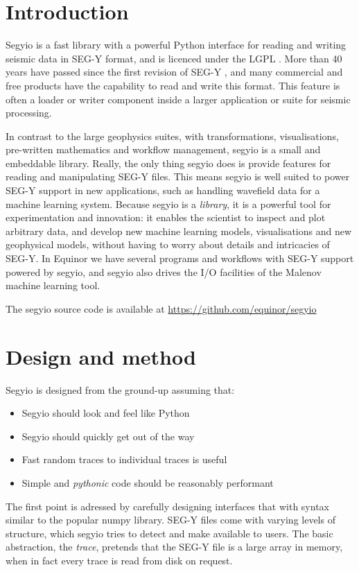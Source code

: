 \documentclass{article}
\begin{document}
\section{Introduction}

Segyio is a fast library with a powerful Python interface for reading and
writing seismic data in SEG-Y format, and is licenced under the LGPL
\citep{lgplv3}. More than 40 years have passed since the first revision of
SEG-Y \citep{barry}, and many commercial and free products have the capability
to read and write this format. This feature is often a loader or writer
component inside a larger application or suite for seismic processing.

In contrast to the large geophysics suites, with transformations,
visualisations, pre-written mathematics and workflow management, segyio is a
small and embeddable library. Really, the only thing segyio does is provide
features for reading and manipulating SEG-Y files. This means segyio is well
suited to power SEG-Y support in new applications, such as handling wavefield
data for a machine learning system. Because segyio is a \emph{library}, it is a
powerful tool for experimentation and innovation: it enables the scientist to
inspect and plot arbitrary data, and develop new machine learning models,
visualisations and new geophysical models, without having to worry about
details and intricacies of SEG-Y. In Equinor we have several programs and
workflows with SEG-Y support powered by segyio, and segyio also drives the I/O
facilities of the Malenov \citep{malenov} machine learning tool.

The segyio source code is available at \url{https://github.com/equinor/segyio}

\section{Design and method}

Segyio is designed from the ground-up assuming that:
\begin{itemize}
    \item Segyio should look and feel like Python
    \item Segyio should quickly get out of the way
    \item Fast random traces to individual traces is useful
    \item Simple and \emph{pythonic} code should be reasonably performant
\end{itemize}

The first point is adressed by carefully designing interfaces that with syntax
similar to the popular numpy \citep{numpy} library. SEG-Y files come with
varying levels of structure, which segyio tries to detect and make available to
users.  The basic abstraction, the \emph{trace}, pretends that the SEG-Y file
is a large array in memory, when in fact every trace is read from disk on
request.
\end{document}
